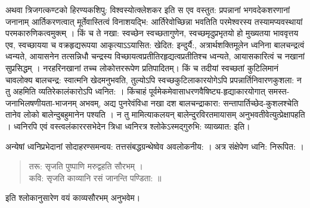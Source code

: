 अथवा त्रिजगत्कण्टको हिरण्यकशिपु: विश्वस्योत्क्लेशकर इति स एव वस्तुत: प्रपन्नानां भगवदेकशरणानां जनानाम् आर्तिकरणत्वात् मूर्तेवास्तित्वं विनाशयद्भि: आर्तिरेवोच्छिन्ना भवतिति परमेश्वरस्य तस्यामप्यवस्थायां परमकारुणिकत्वमुक्त्म् । किं च ते नखा: स्वच्छेन स्वच्छतागुणेन, स्वच्छमृदुप्रभृतयो हो मुख्यतया भाववृत्तय एव, स्वच्छायया च वक्रहृद्यरूपया आकृत्याऽऽयासित: खेदित: इन्दुर्यै:, अत्रार्थशक्तिमूलेन ध्वनिना बालचन्द्रत्वं ध्वन्यते, आयासनेन तत्सन्निधौ चन्द्रस्य विच्छायत्वप्रतीतिरहृद्यत्वप्रतीतिश्च ध्वन्यते, आयासकारित्वं च नखानां सुप्रसिद्धम् । नरहरिनखानां तच्च लोकोत्तररूपेण प्रतिपादितम्। किं च तदीयां स्वच्छतां कुटिलिमानं चावलोक्य बालचन्द्र: स्वात्मनि खेदमनुभवति, तुल्योऽपि स्वच्छकुटिलाकारयोगेऽपि प्रपन्नार्तिनिवारणकुशला: न तु अहमिति व्यतिरेकालंकारोऽपि ध्वनित: । किंचाहं पूर्वमेकमेवासाधरणवैषिष्ट्य-हृद्याकारयोगात् समस्त-जनाभिलषणीयता-भाजनम् अभवम्, अद्य पुनरेवंविधा नखा दश बालचन्द्राकारा: सन्तापार्तिच्छेद-कुशलश्चेति तानेव लोको बालेन्दुबहुमानेन पश्यति । न तु मामित्याकलयन् बालेन्दुरविरतमायासम् अनुभवतीवेत्युत्प्रेक्षापहति । ध्वनिरपि एवं वस्त्वलंकाररसभेदेन त्रिधा ध्वनिरत्र श्लोकेऽस्मद्गुरुभि: व्याख्यात: इति।

अन्येषां ध्वनिप्रभेदानां सोदाहरण्समन्वय: तत्तसंबद्धग्रन्थेष्वेव अवलोकनीय: । अत्र संक्षेपेण ध्वनि: निरूपित: । 
\begin{verse}
तरू: सृजति पुष्पाणि मरुद्वहति सौरभम् ।\\
कवि: सृजति काव्यानि रसं जानन्ति पण्डिता: ॥
\end{verse}
इति श्लोकानुसारेण वयं काव्यसौरभम् अनुभवेम।

\articleend
